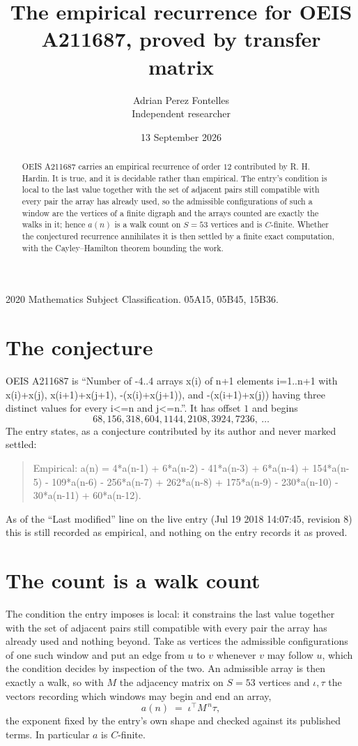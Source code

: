 \documentclass[11pt,a4paper]{article}
\title{The empirical recurrence for OEIS A211687, proved by transfer matrix}
\author{Adrian Perez Fontelles\\ \small Independent researcher}
\date{13 September 2026}
\theoremstyle{plain}
\theoremstyle{definition}
\begin{document}
\maketitle

\begin{abstract}
OEIS A211687 carries an empirical recurrence of order $12$ contributed by R. H. Hardin. It is
true, and it is decidable rather than empirical. The entry's condition is local to the last value together with the set of adjacent pairs still compatible with every pair the array has already used, so
the admissible configurations of such a window are the vertices of a finite digraph and the
arrays counted are exactly the walks in it; hence $a(n)$ is a walk count on $S=53$ vertices
and is $C$-finite. Whether the conjectured recurrence annihilates it is then settled by a
finite exact computation, with the Cayley--Hamilton theorem bounding the work.
\end{abstract}

\noindent\small 2020 Mathematics Subject Classification. 05A15, 05B45, 15B36.\normalsize

\section{The conjecture}

OEIS A211687 is ``Number of -4..4 arrays x(i) of n+1 elements i=1..n+1 with x(i)+x(j), x(i+1)+x(j+1), -(x(i)+x(j+1)), and -(x(i+1)+x(j)) having three distinct values for every i<=n and j<=n.''. It has offset $1$ and begins
\[
68, 156, 318, 604, 1144, 2108, 3924, 7236,\ \dots
\]
The entry states, as a conjecture contributed by its author and never marked settled:
\begin{quote}
Empirical: a(n) = 4*a(n-1) + 6*a(n-2) - 41*a(n-3) + 6*a(n-4) + 154*a(n-5) - 109*a(n-6) - 256*a(n-7) + 262*a(n-8) + 175*a(n-9) - 230*a(n-10) - 30*a(n-11) + 60*a(n-12).
\end{quote}
As of the ``Last modified'' line on the live entry (Jul 19 2018 14:07:45, revision 8) this is still
recorded as empirical, and nothing on the entry records it as proved.

\section{The count is a walk count}

The condition the entry imposes is local: it constrains the last value together with the set of adjacent pairs still compatible with every pair the array has already used and nothing beyond. Take as
vertices the admissible configurations of one such window and put an edge from $u$ to $v$
whenever $v$ may follow $u$, which the condition decides by inspection of the two. An
admissible array is then exactly a walk, so with $M$ the adjacency matrix on $S=53$ vertices
and $\iota,\tau$ the vectors recording which windows may begin and end an array,
\[
a(n)\;=\;\iota^{\!\top}M^{\,n}\tau ,
\]
the exponent fixed by the entry's own shape and checked against its published terms. In
particular $a$ is $C$-finite.
\end{document}
